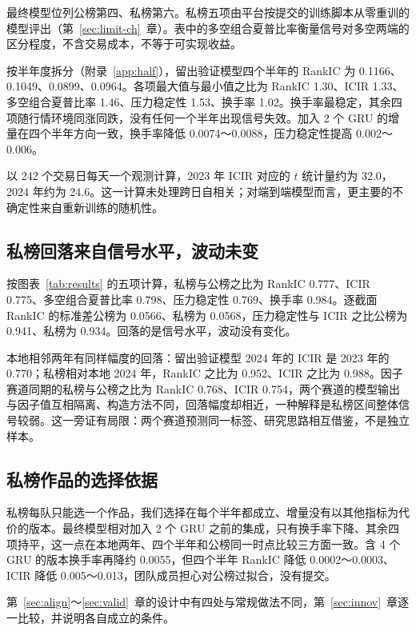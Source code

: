 \documentclass[UTF8,a4paper,zihao=-4,fontset=none]{ctexart}
\newcommand{\figref}[1]{图表~\ref{#1}}
\begin{document}
最终模型位列公榜第四、私榜第六。私榜五项由平台按提交的训练脚本从零重训的模型评出（第~\ref{sec:limit-ch}~章）。表中的多空组合夏普比率衡量信号对多空两端的区分程度，不含交易成本，不等于可实现收益。

按半年度拆分（附录~\ref{app:half}），留出验证模型四个半年的 RankIC 为 0.1166、0.1049、0.0899、0.0964。各项最大值与最小值之比为 RankIC 1.30、ICIR 1.33、多空组合夏普比率 1.46、压力稳定性 1.53、换手率 1.02。换手率最稳定，其余四项随行情环境同涨同跌，没有任何一个半年出现信号失效。加入 2 个 GRU 的增量在四个半年方向一致，换手率降低 0.0074～0.0088，压力稳定性提高 0.002～0.006。

以 242 个交易日每天一个观测计算，2023 年 ICIR 对应的 $t$ 统计量约为 32.0，2024 年约为 24.6。这一计算未处理跨日自相关；对端到端模型而言，更主要的不确定性来自重新训练的随机性。

\subsection{私榜回落来自信号水平，波动未变}

按\figref{tab:results} 的五项计算，私榜与公榜之比为 RankIC 0.777、ICIR 0.775、多空组合夏普比率 0.798、压力稳定性 0.769、换手率 0.984。逐截面 RankIC 的标准差公榜为 0.0566、私榜为 0.0568，压力稳定性与 ICIR 之比公榜为 0.941、私榜为 0.934。回落的是信号水平，波动没有变化。

本地相邻两年有同样幅度的回落：留出验证模型 2024 年的 ICIR 是 2023 年的 0.770；私榜相对本地 2024 年，RankIC 之比为 0.952、ICIR 之比为 0.988。因子赛道同期的私榜与公榜之比为 RankIC 0.768、ICIR 0.754，两个赛道的模型输出与因子值互相隔离、构造方法不同，回落幅度却相近，一种解释是私榜区间整体信号较弱。这一旁证有局限：两个赛道预测同一标签、研究思路相互借鉴，不是独立样本。

\subsection{私榜作品的选择依据}

私榜每队只能选一个作品，我们选择在每个半年都成立、增量没有以其他指标为代价的版本。最终模型相对加入 2 个 GRU 之前的集成，只有换手率下降、其余四项持平，这一点在本地两年、四个半年和公榜同一时点比较三方面一致。含 4 个 GRU 的版本换手率再降约 0.0055，但四个半年 RankIC 降低 0.0002～0.0003、ICIR 降低 0.005～0.013，团队成员担心对公榜过拟合，没有提交。

第~\ref{sec:align}～\ref{sec:valid}~章的设计中有四处与常规做法不同，第~\ref{sec:innov}~章逐一比较，并说明各自成立的条件。
\end{document}
